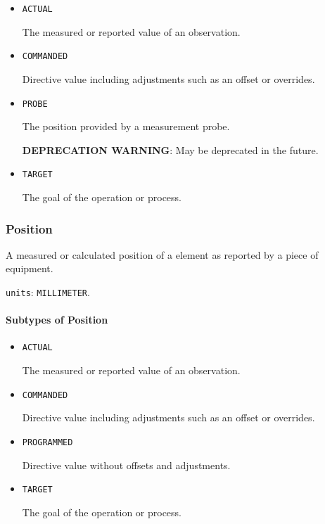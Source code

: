 \begin{itemize}

\item \texttt{ACTUAL}


The measured or reported value of an \gls{observation}.

\item \texttt{COMMANDED}


Directive value including adjustments such as an offset or overrides.

\item \texttt{PROBE}


The position provided by a measurement probe.

\textbf{DEPRECATION WARNING}: May be deprecated in the future.

\item \texttt{TARGET}


The goal of the operation or process.


\end{itemize}







\subsubsection{Position}
\label{sec:Position}



A measured or calculated position of a  element as reported by a piece of equipment.


\texttt{units}: \texttt{MILLIMETER}.

\paragraph{Subtypes of Position}\mbox{}
\label{sec:Subtypes of Position}

\begin{itemize}

\item \texttt{ACTUAL}


The measured or reported value of an \gls{observation}.

\item \texttt{COMMANDED}


Directive value including adjustments such as an offset or overrides.

\item \texttt{PROGRAMMED}


Directive value without offsets and adjustments.

\item \texttt{TARGET}


The goal of the operation or process.


\end{itemize}







